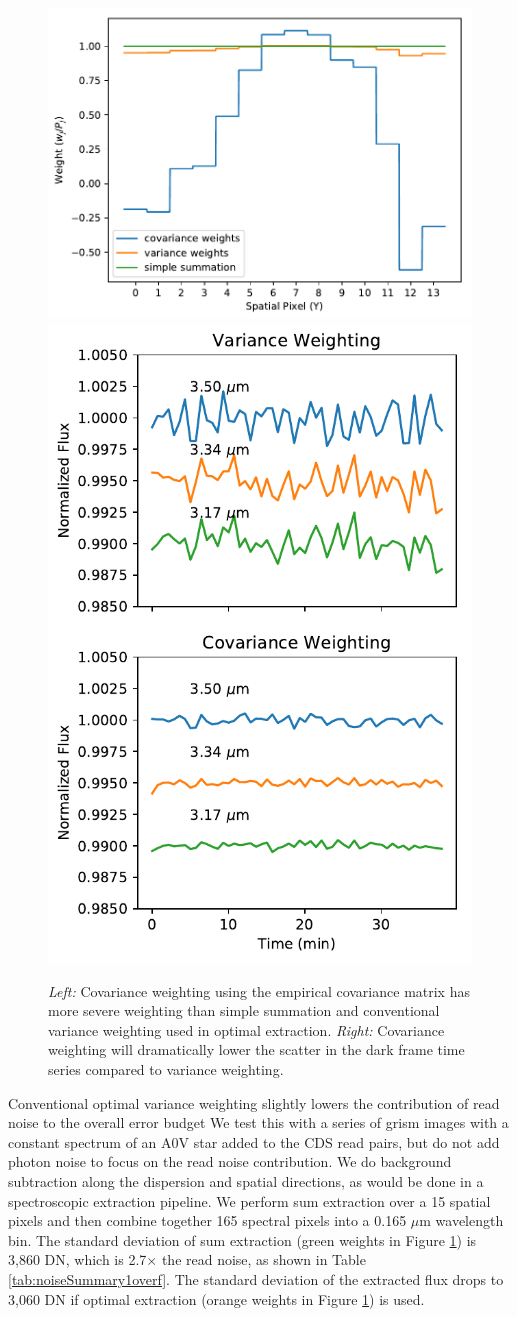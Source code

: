 \documentclass[]{aastex62}
\begin{document}
\begin{figure}[!hbtp]
\centering
\includegraphics[width=.66\columnwidth]{cov_weighted_weights.pdf}
\includegraphics[width=.32\columnwidth]{zoom_cov_vs_var_tser.pdf}
\caption{ {\it Left:} Covariance weighting using the empirical covariance matrix has more severe weighting than simple summation and conventional variance weighting used in optimal extraction. {\it Right:} Covariance weighting will dramatically lower the scatter in the dark frame time series compared to variance weighting.}\label{fig:covWeightedSummation}
\end{figure}

Conventional optimal variance weighting slightly lowers the contribution of read noise to the overall error budget
We test this with a series of grism images with a constant spectrum of an A0V star added to the CDS read pairs, but do not add photon noise to focus on the read noise contribution.
We do background subtraction along the dispersion and spatial directions, as would be done in a spectroscopic extraction pipeline.
We perform sum extraction over a 15 spatial pixels and then combine together 165 spectral pixels into a 0.165 $\mu$m wavelength bin.
The standard deviation of sum extraction (green weights in Figure \ref{fig:covWeightedSummation}) is 3,860 DN, which is 2.7$\times$ the read noise, as shown in Table \ref{tab:noiseSummary1overf}.
The standard deviation of the extracted flux drops to 3,060 DN if optimal extraction (orange weights in Figure \ref{fig:covWeightedSummation}) is used.
\end{document}
